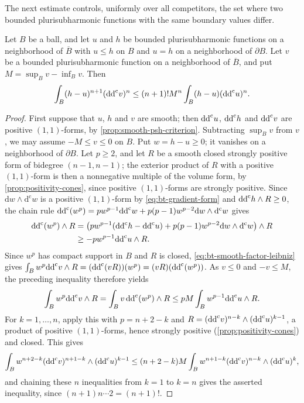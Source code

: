 The next estimate controls, uniformly over all competitors, the set where two bounded plurisubharmonic functions with the same boundary values differ.

\begin{proposition}[B\l{}ocki]\label{prop:blocki-difference-estimate}
Let $B$ be a ball, and let $u$ and $h$ be bounded plurisubharmonic functions on a neighborhood of $\overline B$ with $u\le h$ on $B$ and $u=h$ on a neighborhood of $\partial B$. Let $v$ be a bounded plurisubharmonic function on a neighborhood of $\overline B$, and put $M=\sup_Bv-\inf_Bv$. Then
\[
 \int_B(h-u)^{n+1}(\mathrm{dd}^{\mathrm{c}} v)^n
       \le(n+1)!M^n\int_B(h-u)(\mathrm{dd}^{\mathrm{c}} u)^n.
\]
\end{proposition}
\begin{proof}
First suppose that $u$, $h$ and $v$ are smooth; then $\mathrm{dd}^{\mathrm{c}} u$, $\mathrm{dd}^{\mathrm{c}} h$ and $\mathrm{dd}^{\mathrm{c}} v$ are positive $(1,1)$-forms, by \cref{prop:smooth-psh-criterion}. Subtracting $\sup_Bv$ from $v$, we may assume $-M\le v\le0$ on $B$. Put $w=h-u\ge0$; it vanishes on a neighborhood of $\partial B$. Let $p\ge2$, and let $R$ be a smooth closed strongly positive form of bidegree $(n-1,n-1)$; the exterior product of $R$ with a positive $(1,1)$-form is then a nonnegative multiple of the volume form, by \cref{prop:positivity-cones}, since positive $(1,1)$-forms are strongly positive. Since $\mathrm{d}w\wedge\mathrm{d}^{\mathrm c}w$ is a positive $(1,1)$-form by \eqref{eq:bt-gradient-form} and $\mathrm{dd}^{\mathrm{c}} h\wedge R\ge0$, the chain rule $\mathrm{dd}^{\mathrm{c}}(w^p)=pw^{p-1}\mathrm{dd}^{\mathrm{c}} w+p(p-1)w^{p-2}\mathrm dw\wedge\mathrm d^{\mathrm c}w$ gives
\[
 \begin{aligned}
 \mathrm{dd}^{\mathrm{c}}(w^p)\wedge R&=\bigl(p w^{p-1}(\mathrm{dd}^{\mathrm{c}} h-\mathrm{dd}^{\mathrm{c}} u)
               +p(p-1)w^{p-2}\mathrm{d}w\wedge\mathrm{d}^{\mathrm c}w\bigr)\wedge R\\
 &\ge-pw^{p-1}\mathrm{dd}^{\mathrm{c}} u\wedge R.
 \end{aligned}
\]
Since $w^p$ has compact support in $B$ and $R$ is closed, \eqref{eq:bt-smooth-factor-leibniz} gives $\int_Bw^p\mathrm{dd}^{\mathrm{c}} v\wedge R=(\mathrm{dd}^{\mathrm{c}}(vR))(w^p)=(vR)(\mathrm{dd}^{\mathrm{c}}(w^p))$. As $v\le0$ and $-v\le M$, the preceding inequality therefore yields
\[
 \int_Bw^p\mathrm{dd}^{\mathrm{c}} v\wedge R
   =\int_Bv\,\mathrm{dd}^{\mathrm{c}}(w^p)\wedge R
   \le pM\int_Bw^{p-1}\mathrm{dd}^{\mathrm{c}} u\wedge R.
\]
For $k=1,\ldots,n$, apply this with $p=n+2-k$ and $R=(\mathrm{dd}^{\mathrm{c}} v)^{n-k}\wedge(\mathrm{dd}^{\mathrm{c}} u)^{k-1}$, a product of positive $(1,1)$-forms, hence strongly positive (\cref{prop:positivity-cones}) and closed. This gives
\[
 \int_Bw^{n+2-k}(\mathrm{dd}^{\mathrm{c}} v)^{n+1-k}\wedge(\mathrm{dd}^{\mathrm{c}} u)^{k-1}\le(n+2-k)M\int_Bw^{n+1-k}(\mathrm{dd}^{\mathrm{c}} v)^{n-k}\wedge(\mathrm{dd}^{\mathrm{c}} u)^k,
\]
and chaining these $n$ inequalities from $k=1$ to $k=n$ gives the asserted inequality, since $(n+1)n\cdots2=(n+1)!$.


\end{proof}
